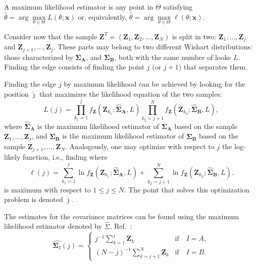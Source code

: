 \documentclass[conference]{IEEEtran}
\begin{document}
A maximum likelihood estimator is any point in $\Theta$ satisfying $\widehat{\theta}= \arg\max\limits_{\theta\in\Theta}L(\theta;\mathbf{x})$ or, equivalently, $\widehat{\theta}= \arg\max\limits_{\theta\in\Theta}\ell(\theta;\mathbf{x})$.

Consider now that the sample $\mathbf{Z}^T=(\mathbf{Z}_1,\mathbf{Z}_2,\dots,\mathbf{Z}_N)$ is split in two: $\mathbf{Z}_1,\dots,\mathbf{Z}_j$ and $\mathbf{Z}_{j+1},\dots,\mathbf{Z}_j$.
These parts may belong to two different Wishart distributions: those characterized by  $\mathbf{\Sigma_A}$, and $\mathbf{\Sigma_B}$, both with the same number of looks $L$.
Finding the edge consists of finding the point $j$ (or $j+1$) that separates them.

Finding the edge $j$ by maximum likelihood can be achieved by looking for the position $\widehat\jmath$  that maximizes the likelihood equation of the two samples:
%
\begin{equation}
	L(j)=\prod_{k_1=1}^{j}f_{\mathbf{Z}}(\mathbf{Z}_{k_1};\mathbf{\widehat\Sigma_{A}},L) \prod_{k_2=j+1}^{N}f_{\mathbf{Z}}(\mathbf{Z}_{k_2};\mathbf{\widehat\Sigma_{B}},L),
	\label{eq_06}
\end{equation}
where $\mathbf{\widehat\Sigma_{A}}$ is the maximum likelihood estimator of $\mathbf{\Sigma_{A}}$ based on the sample $\mathbf{Z}_1,\dots,\mathbf{Z}_{j}$, 
and $\mathbf{\widehat\Sigma_{B}}$ is the maximum likelihood estimator of $\mathbf{\Sigma_{B}}$ based on the sample $\mathbf{Z}_{j+1},\dots,\mathbf{Z}_{N}$.
Analogously, one may optimize with respect to $j$ the log-likely function, i.e., finding where
\begin{equation}
\ell(j) =
	\sum_{k_1=1}^{j}\ln f_{\mathbf{Z}}(\mathbf{Z}_{k_1}; \mathbf{\widehat\Sigma_{A}},L) + \sum_{k_2=j+1}^{N}\ln f_{\mathbf{Z}}(\mathbf{Z}_{k_2};     \mathbf{\widehat\Sigma_{B}},L).
	\label{eq_07}
\end{equation}
is maximum with respect to $1\leq j \leq N$.
The point that solves this optimization problem is denoted $\widehat{\jmath}$.

The estimates for the covariance matrices can be found using the maximum likelihood estimator denoted by $\widehat{\Sigma}$, Ref.~\cite{good}: 
\begin{equation}
\widehat{\mathbf\Sigma_{I}}(j) = \left\{
\begin{array}{lc}
	j^{-1}\sum_{k=1}^{j}\mathbf{Z}_{k}  & \mbox{if}\quad I=A,  \\
        (N-j)^{-1}\sum_{k=j+1}^{N}\mathbf{Z}_{k} & \mbox{if}\quad I=B.
\end{array}
\right.\label{eq_08}
\end{equation}
\end{document}
